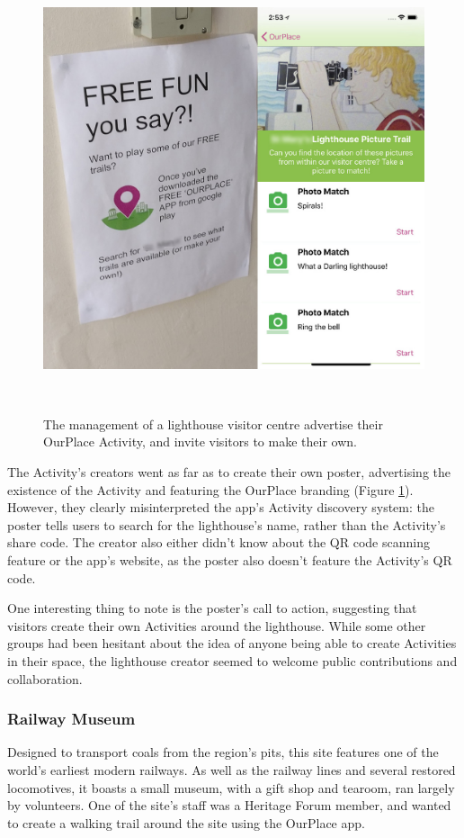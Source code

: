 \begin{figure}
  \centering
  \includegraphics[width=0.75\columnwidth]{images/chapter06/OurPlaceLighthouse.jpg}
  \caption[An OurPlace Activity at a lighthouse]{The management of a lighthouse visitor centre advertise their OurPlace Activity, and invite visitors to make their own.}~\label{fig:OurPlaceLighthouse}
\end{figure}

The Activity's creators went as far as to create their own poster, advertising the existence of the Activity and featuring the OurPlace branding (Figure \ref{fig:OurPlaceLighthouse}). However, they clearly misinterpreted the app's Activity discovery system: the poster tells users to search for the lighthouse's name, rather than the Activity's share code. The creator also either didn't know about the QR code scanning feature or the app's website, as the poster also doesn't feature the Activity's QR code. 

One interesting thing to note is the poster's call to action, suggesting that visitors create their own Activities around the lighthouse. While some other groups had been hesitant about the idea of anyone being able to create Activities in their space, the lighthouse creator seemed to welcome public contributions and collaboration.

\subsubsection{Railway Museum}

Designed to transport coals from the region's pits, this site features one of the world's earliest modern railways. As well as the railway lines and several restored locomotives, it boasts a small museum, with a gift shop and tearoom, ran largely by volunteers. One of the site's staff was a Heritage Forum member, and wanted to create a walking trail around the site using the OurPlace app.

